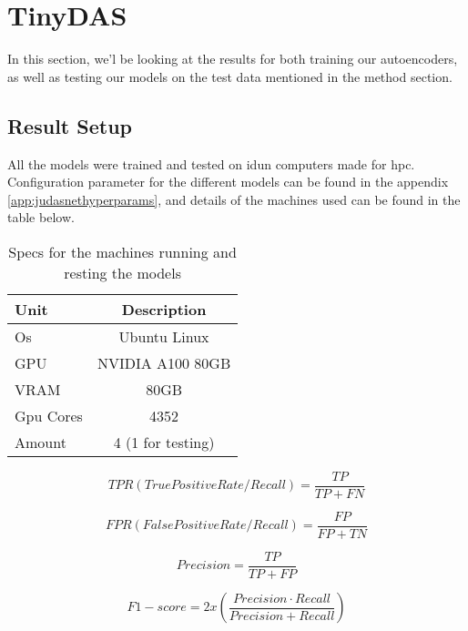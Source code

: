 \section{TinyDAS}
\label{res:tinydas}

In this section, we'l be looking at the results for both training our autoencoders, as well as testing our models on the test data mentioned in the method section.

\subsection{Result Setup}

All the models were trained and tested on \gls{idun} computers made for \acrshort{hpc}. Configuration parameter for the different models can be found in the appendix \ref{app:judasnethyperparams}, and details of the machines used can be found in the table below. \\



\begin{table}[h]
\centering
\begin{tabular}{|l|c|}
\hline
\textbf{Unit} & \textbf{Description}         \\ \hline
Os            & Ubuntu Linux          \\ \hline
GPU           & NVIDIA A100 80GB     \\ \hline
VRAM          & 80GB                  \\ \hline
Gpu Cores     & 4352                  \\ \hline
Amount        & 4 (1 for testing)     \\ \hline
\end{tabular}
\label{tab:specs}
\caption{Specs for the machines running and resting the models}
\end{table}

\begin{equation}
    TPR(TruePositiveRate/Recall) = \frac{TP}{TP + FN}
\end{equation}

\begin{equation}
    FPR(FalsePositiveRate/Recall) = \frac{FP}{FP + TN}
\end{equation}

\begin{equation}
    Precision = \frac{TP}{TP + FP}
\end{equation}

\begin{equation}
    F1 - score = 2 x (\frac{Precision \cdot Recall}{Precision + Recall})
\end{equation}

